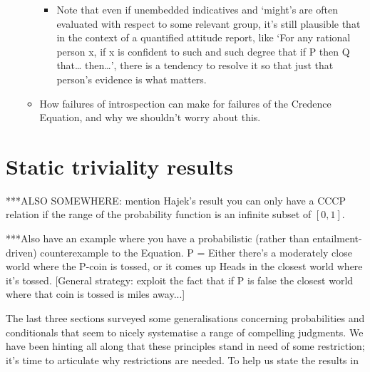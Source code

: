 \documentclass[If.tex]{subfiles}
\begin{document}
\begin{itemize}
\begin{itemize}
    \begin{itemize}
        \item
      Note that even if unembedded indicatives and ‘might’s are often
      evaluated with respect to some relevant group, it's still
      plausible that in the context of a quantified attitude report,
      like ‘For any rational person x, if x is confident to such and
            such degree that if P then Q that\ldots{} then\ldots{}’, there is
      a tendency to resolve it so that just that person's evidence is
      what matters.
    \end{itemize}
  \item
    How failures of introspection can make for failures of the Credence
    Equation, and why we shouldn't worry about this.
  \end{itemize}
\end{itemize}


\section{Static triviality results}
***ALSO SOMEWHERE: mention Hajek's result you can only have a CCCP relation if the range of the probability function is an infinite subset of $[0,1]$.

***Also have an example where you have a probabilistic (rather than entailment-driven) counterexample to the Equation.  P = Either there's a moderately close world where the P-coin is tossed, or it comes up Heads in the closest world where it's tossed.  [General strategy: exploit the fact that if P is false the closest world where that coin is tossed is miles away...]

The last three sections surveyed some generalisations concerning probabilities and conditionals that seem to nicely systematise a range of compelling judgments.  We have been hinting all along that these principles stand in need of some restriction; it's time to articulate why restrictions are needed.  To help us state the results in

\end{document}

